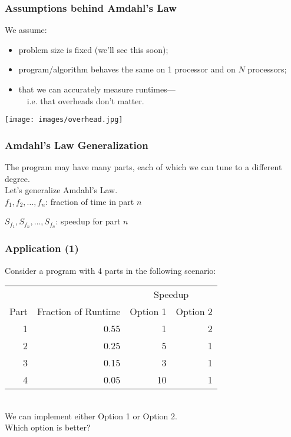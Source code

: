 \begin{frame}
  \frametitle{Assumptions behind Amdahl's Law}

    We assume:
    \begin{itemize}
    \item problem size is fixed (we'll see this soon);
    \item program/algorithm behaves the same on 1 processor and on $N$ processors;
    \item that we can accurately measure runtimes---\\ ~~i.e. that overheads don't matter.
    \end{itemize}
    
    \begin{center}
	\texttt{[image: images/overhead.jpg]}
	\end{center}
  
\end{frame}

\begin{frame}
  \frametitle{Amdahl's Law Generalization}

  \hspace*{2em} The program may have many parts, each of which we can tune to
  a different degree.\\[1em]

  Let's generalize Amdahl's Law.\\[1em]

  $f_1, f_2, \ldots, f_n$: fraction of time in part $n$

  $S_{f_1}, S_{f_n}, \ldots, S_{f_n}$: speedup for part $n$

  \vfill
  \begin{center}
  \structure{\[\mbox{\em speedup} = \frac{1}{\frac{f_1}{S_{f_1}} + \frac{f_2}{S_{f_2}} + \ldots +
    \frac{f_n}{S_{f_n}}}\]}
  \end{center}
\end{frame}


\begin{frame}
  \frametitle{Application (1)}

  \hspace*{2em} 
Consider a program with 4 parts in the following scenario:\\[2em]
    \begin{tabular}{r|r|r|r}
    \multicolumn{2}{l}{} & \multicolumn{2}{c}{Speedup} \\
    Part & Fraction of Runtime & Option 1 & Option 2\\
    \hline
    1 & 0.55 & 1  & 2\\
    2 & 0.25 & 5  & 1\\
    3 & 0.15 & 3  & 1\\
    4 & 0.05  & 10 & 1\\
  \end{tabular}

~\\[2em]
  We can implement either Option 1 or Option 2. \\
  Which option is better?

\end{frame}

